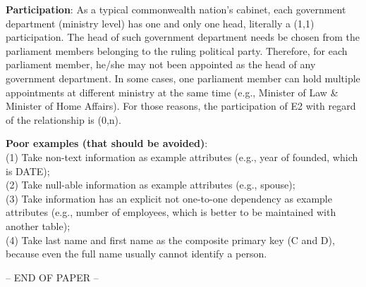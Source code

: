 \documentclass[10pt,a4paper,answers]{exam}
\begin{document}
\begin{questions}
\begin{parts}
\begin{solution}
\textbf{Participation}: As a typical commonwealth nation's cabinet, each government department (ministry level) has one and only one head, literally a (1,1) participation. The head of such government department needs be chosen from the parliament members belonging to the ruling political party. Therefore, for each parliament member, he/she may not been appointed as the head of any government department. In some cases, one parliament member can hold multiple appointments at different ministry at the same time (e.g., Minister of Law \& Minister of Home Affairs). For those reasons, the participation of E2 with regard of the relationship is (0,n).

\vspace{5pt}
\textbf{Poor examples (that should be avoided)}: \\
(1) Take non-text information as example attributes (e.g., year of founded, which is DATE);\\
(2) Take null-able information as example attributes (e.g., spouse);\\
(3) Take information has an explicit not one-to-one dependency as example attributes (e.g., number of employees, which is better to be maintained with another table);\\
(4) Take last name and first name as the composite primary key (C and D), because even the full name usually cannot identify a person.

\end{solution}
\end{parts}
\end{questions}

\begin{center}-- END OF PAPER --\end{center}
\end{document}
